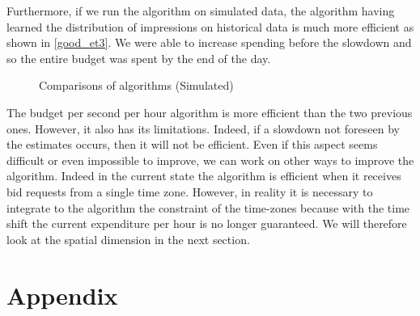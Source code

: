 \documentclass[12pt]{article}
\begin{document}
\newpage 

Furthermore, if we run the algorithm on simulated data, the algorithm having learned the distribution of impressions on historical data is much more efficient as shown in \autoref{good_et3}. We were able to increase spending before the slowdown and so the entire budget was spent by the end of the day.

\begin{figure}[h!]
	\centering
	\vspace{-.7cm}
	\caption{Comparisons of algorithms (Simulated)}
	\label{good_et3}
\end{figure}

The budget per second per hour algorithm is more efficient than the two previous ones. However, it also has its limitations. Indeed, if a slowdown not foreseen by the estimates occurs, then it will not be efficient. Even if this aspect seems difficult or even impossible to improve, we can work on other ways to improve the algorithm. Indeed in the current state the algorithm is efficient when it receives bid requests from a single time zone. However, in reality it is necessary to integrate to the algorithm the constraint of the time-zones because with the time shift the current expenditure per hour is no longer guaranteed. We will therefore look at the spatial dimension in the next section.

\newpage


\section*{Appendix}
\end{document}
